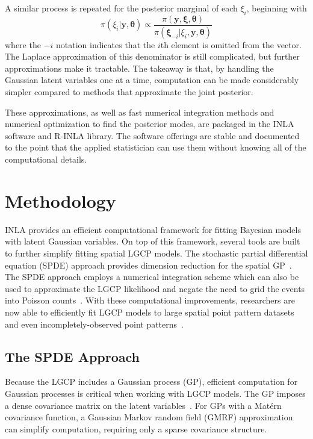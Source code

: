 \documentclass[]{interact}
\begin{document}
A similar process is repeated for the posterior marginal of each \(\xi_{i}\),
beginning with
\begin{equation}
\pi\left(\xi_{i} | \mathbf{y}, \boldsymbol{\theta}\right)
\propto \frac{\pi\left(\mathbf{y}, \boldsymbol{\xi}, \boldsymbol{\theta}\right)}
{\pi\left(\boldsymbol{\xi}_{-i} | \xi_{i}, \mathbf{y}, \boldsymbol{\theta}\right)}
\end{equation}
where the \(-i\) notation indicates that the \(i\)th element is omitted from
the vector. The Laplace approximation of this denominator is still complicated,
but further approximations make it tractable. The takeaway is that, by
handling the Gaussian latent variables one at a time, computation can be made
considerably simpler compared to methods that approximate the joint posterior.

These approximations, as well as fast numerical integration methods and
numerical optimization to find the posterior modes, are packaged in the INLA
software and R-INLA library. The software offerings are stable and documented
to the point that the applied statistician can use them without knowing all of
the computational details.


\section{Methodology}
\label{methods}

INLA provides an efficient computational framework for fitting Bayesian models
with latent Gaussian variables. On top of this framework, several tools are
built to further simplify fitting spatial LGCP models. The stochastic
partial differential equation (SPDE) approach provides dimension reduction for
the spatial GP~\cite{lindgrenetal}. The SPDE approach employs a numerical
integration scheme which can also be used to approximate the LGCP likelihood
and negate the need to grid the events into Poisson counts~\cite{simpsonetal}.
With these computational improvements, researchers are now able to efficiently
fit LGCP models to large spatial point pattern datasets and even
incompletely-observed point patterns~\cite{yuanetal}.  


\subsection{The SPDE Approach}
\label{spde}

Because the LGCP includes a Gaussian process (GP), efficient computation for
Gaussian processes is critical when working with LGCP models. The GP imposes a
dense covariance matrix on the latent variables~\cite{rinla}. For GPs with a
Mat\'{e}rn covariance function, a Gaussian Markov random field (GMRF)
approximation can simplify computation, requiring only a sparse covariance
structure.
\end{document}
